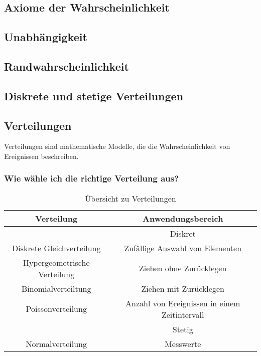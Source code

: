 \documentclass[12pt]{scrartcl}
\begin{document}
\subsection{Axiome der Wahrscheinlichkeit}
\subsection{Unabhängigkeit}
\subsection{Randwahrscheinlichkeit}
\subsection{Diskrete und stetige Verteilungen}

\pagebreak

\subsection{Verteilungen}

Verteilungen sind mathematische Modelle, die die Wahrscheinlichkeit von Ereignissen beschreiben.

\subsubsection{Wie wähle ich die richtige Verteilung aus?}

\begin{table}[h]
    \begin{tabular}{ | c | c | }
        \hline
        Verteilung                   & Anwendungsbereich                             \\
        \hline
        \hline
                                     & Diskret                                       \\
        \hline
        Diskrete Gleichverteilung    & Zufällige Auswahl von Elementen               \\
        \hline
        Hypergeometrische Verteilung & Ziehen ohne Zurücklegen                       \\
        \hline
        Binomialverteiltung          & Ziehen mit Zurücklegen                        \\
        \hline
        Poissonverteilung            & Anzahl von Ereignissen in einem Zeitintervall \\
        \hline
        \hline
                                     & Stetig                                        \\
        \hline
        Normalverteilung             & Messwerte                                     \\
        \hline
    \end{tabular}
    \caption{Übersicht zu Verteilungen}
\end{table}
\end{document}
